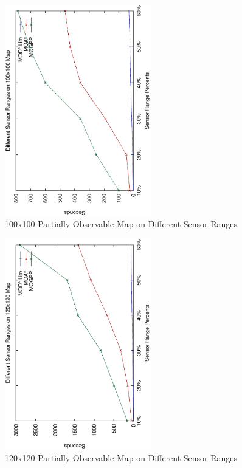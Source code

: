 \documentclass[10pt,journal]{IEEEtran}
\begin{document}
\begin{figure}
\centering
\includegraphics[width=2.5in, angle=270]{experimental/100x100_partially_normal}
\caption{100x100 Partially Observable Map on Different Sensor Ranges}
\label{fig:100x100sensor}
\end{figure}

\begin{figure}
\centering
\includegraphics[width=2.5in, angle=270]{experimental/120x120_partially_normal}
\caption{120x120 Partially Observable Map on Different Sensor Ranges}
\label{fig:120x120sensor}
\end{figure}
\end{document}
